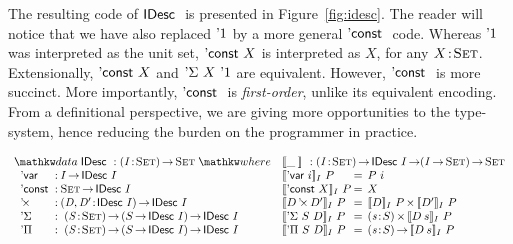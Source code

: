 The resulting code of $\IDesc$ is presented in
Figure~\ref{fig:idesc}. The reader will notice that we have also
replaced $\DUnit$ by a more general $\DConst$ code. Whereas $\DUnit$
was interpreted as the unit set, $\DConst{X}$ is interpreted as $X$,
for any $\Bhab{X}{\Set}$. Extensionally, $\DConst{X}$ and
$\DSigma{X}{\DUnit}$ are equivalent. However, $\DConst$ is more
succinct. More importantly, $\DConst$ is \emph{first-order}, unlike
its equivalent encoding. From a definitional perspective, we are
giving more opportunities to the type-system, hence reducing the
burden on the programmer in practice.

\begin{figure*}

\[
\begin{array}{ll}
\stk{
\data \IDesc{} : \PI{\V{I}}{\Set} \Set \where \\
\;\;\begin{array}{@{}l@{\::\:}l@{\quad}l}
    \DVar{}         & I \To \IDesc{I}                                   \\
    \DConst{}       & \Set \To \IDesc{I}                                \\
    \DProd{}{}      & \PI{\V{D}, \V{D'}}{\IDesc{I}} \IDesc{I}           \\
    \DSigma         & \PI{\V{S}}{\Set} \PIS{S \To \IDesc{I}} \IDesc{I}  \\
    \DPi            & \PI{\V{S}}{\Set} \PIS{S \To \IDesc{I}} \IDesc{I} 
\end{array}
}
&
\stk{
\idescop{\_\:}{}{} : \PI{\V{I}}{\Set} \IDesc{I} \To (\V{I} \To \Set) \To \Set                  \\
\begin{array}{@{}l@{\:=\:\:}ll}
\idescop{\DVar{i}}{I}{P}      &  P~i                                                 \\
\idescop{\DConst{X}}{I}{P}    &  X                                                   \\
\idescop{\DProd{D}{D'}}{I}{P} &  \TIMES{\idescop{D}{I}{P}}{\idescop{D'}{I}{P}}       \\
\idescop{\DSigma{S}{D}}{I}{P} &  \SIGMA{\V{s}}{S} \idescop{D\: s}{I}{P}                    \\
\idescop{\DPi{S}{D}}{I}{P}    &  \PI{\V{s}}{S} \idescop{D\: s}{I}{P}            
\end{array}
}
\end{array}
\]

\caption{Universe of indexed description}
\label{fig:idesc}

\end{figure*}


